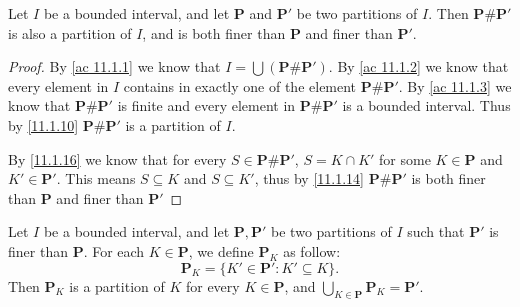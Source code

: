 \setcounter{theorem}{17}
\begin{lemma}\label{11.1.18}
  Let \(I\) be a bounded interval, and let \(\mathbf{P}\) and \(\mathbf{P}'\) be two partitions of \(I\).
  Then \(\mathbf{P} \# \mathbf{P}'\) is also a partition of \(I\), and is both finer than \(\mathbf{P}\) and finer than \(\mathbf{P}'\).
\end{lemma}

\begin{proof}
  By \cref{ac 11.1.1} we know that \(I = \bigcup (\mathbf{P} \# \mathbf{P}')\).
  By \cref{ac 11.1.2} we know that every element in \(I\) contains in exactly one of the element \(\mathbf{P} \# \mathbf{P}'\).
  By \cref{ac 11.1.3} we know that \(\mathbf{P} \# \mathbf{P}'\) is finite and every element in  \(\mathbf{P} \# \mathbf{P}'\) is a bounded interval.
  Thus by \cref{11.1.10} \(\mathbf{P} \# \mathbf{P}'\) is a partition of \(I\).

  By \cref{11.1.16} we know that for every \(S \in \mathbf{P} \# \mathbf{P}'\), \(S = K \cap K'\) for some \(K \in \mathbf{P}\) and \(K' \in \mathbf{P}'\).
  This means \(S \subseteq K\) and \(S \subseteq K'\), thus by \cref{11.1.14} \(\mathbf{P} \# \mathbf{P}'\) is both finer than \(\mathbf{P}\) and finer than \(\mathbf{P}'\)
\end{proof}

\begin{additional corollary}\label{ac 11.1.4}
Let \(I\) be a bounded interval, and let \(\mathbf{P}, \mathbf{P}'\) be two partitions of \(I\) such that \(\mathbf{P}'\) is finer than \(\mathbf{P}\).
For each \(K \in \mathbf{P}\), we define \(\mathbf{P}_K\) as follow:
\[
  \mathbf{P}_K = \{K' \in \mathbf{P}' : K' \subseteq K\}.
\]
Then \(\mathbf{P}_K\) is a partition of \(K\) for every \(K \in \mathbf{P}\), and \(\bigcup_{K \in \mathbf{P}} \mathbf{P}_K = \mathbf{P}'\).
\end{additional corollary}

